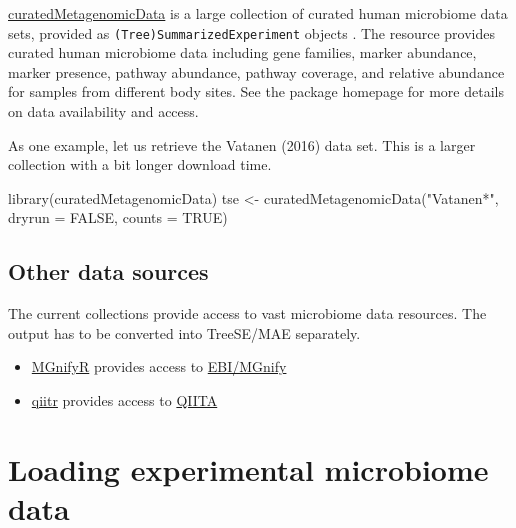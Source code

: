 \documentclass[
]{book}
\newenvironment{Shaded}{\begin{snugshade}}{\end{snugshade}}
\newcommand{\AttributeTok}[1]{\textcolor[rgb]{0.77,0.63,0.00}{#1}}
\newcommand{\ConstantTok}[1]{\textcolor[rgb]{0.00,0.00,0.00}{#1}}
\newcommand{\FunctionTok}[1]{\textcolor[rgb]{0.00,0.00,0.00}{#1}}
\newcommand{\NormalTok}[1]{#1}
\newcommand{\OtherTok}[1]{\textcolor[rgb]{0.56,0.35,0.01}{#1}}
\newcommand{\StringTok}[1]{\textcolor[rgb]{0.31,0.60,0.02}{#1}}
\providecommand{\tightlist}{%
  \setlength{\itemsep}{0pt}\setlength{\parskip}{0pt}}
\begin{document}
\href{https://bioconductor.org/packages/release/data/experiment/html/curatedMetagenomicData.html}{curatedMetagenomicData}
is a large collection of curated human microbiome data sets, provided as
\texttt{(Tree)SummarizedExperiment} objects \citep{Pasolli2017}. The resource
provides curated human microbiome data including gene families, marker
abundance, marker presence, pathway abundance, pathway coverage, and
relative abundance for samples from different body sites. See the
package homepage for more details on data availability and access.

As one example, let us retrieve the Vatanen (2016) \citep{Vatanen2016} data
set. This is a larger collection with a bit longer download time.

\begin{Shaded}
\begin{Highlighting}[]
\FunctionTok{library}\NormalTok{(curatedMetagenomicData)}
\NormalTok{tse }\OtherTok{\textless{}{-}} \FunctionTok{curatedMetagenomicData}\NormalTok{(}\StringTok{"Vatanen*"}\NormalTok{, }\AttributeTok{dryrun =} \ConstantTok{FALSE}\NormalTok{, }\AttributeTok{counts =} \ConstantTok{TRUE}\NormalTok{)}
\end{Highlighting}
\end{Shaded}

\hypertarget{other-data-sources}{%
\subsection{Other data sources}\label{other-data-sources}}

The current collections provide access to vast microbiome data
resources. The output has to be converted into TreeSE/MAE separately.

\begin{itemize}
\tightlist
\item
  \href{https://github.com/beadyallen/MGnifyR}{MGnifyR} provides access to \href{https://www.ebi.ac.uk/metagenomics/}{EBI/MGnify}
\item
  \href{https://github.com/cran/qiitr}{qiitr} provides access to \href{https://qiita.com/about}{QIITA}
\end{itemize}

\hypertarget{loading-experimental-microbiome-data}{%
\section{Loading experimental microbiome data}\label{loading-experimental-microbiome-data}}
\end{document}
